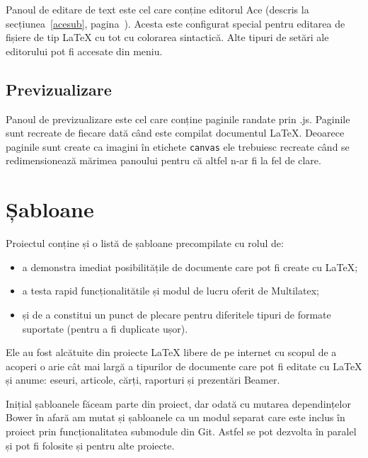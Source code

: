 \documentclass[a4wide,12pt]{report}
\newcommand{\cod}[1]{\texttt{#1}}
\newcommand{\acr}[1]{{\textsmaller[1]{\textsc{#1}}}} %
\begin{document}
Panoul de editare de text este cel care conține editorul Ace (descris la
secțiunea~\ref{acesub}, pagina~\pageref{acesub}). Acesta este configurat special
pentru editarea de fișiere de tip \LaTeX{} cu tot cu colorarea sintactică. Alte
tipuri de setări ale editorului pot fi accesate din meniu.

\subsection{Previzualizare}

Panoul de previzualizare este cel care conține paginile randate prin
\acr{PDF}.js. Paginile sunt recreate de fiecare dată când este compilat
documentul \LaTeX{}. Deoarece paginile sunt create ca imagini în etichete
\cod{canvas} ele trebuiesc recreate când se redimensionează mărimea panoului
pentru că altfel n-ar fi la fel de clare.

\section{Șabloane}
\label{sabloanesec}

Proiectul conține și o listă de șabloane precompilate cu rolul de:

\begin{itemize}

\item a demonstra imediat posibilitățile de documente care pot fi create cu
\LaTeX{};

\item a testa rapid funcționalitătile și modul de lucru oferit de Multilatex;

\item și de a constitui un punct de plecare pentru diferitele tipuri de formate
suportate (pentru a fi duplicate ușor).

\end{itemize}

Ele au fost alcătuite din proiecte \LaTeX{} libere de pe internet cu scopul de a
acoperi o arie cât mai largă a tipurilor de documente care pot fi editate cu
\LaTeX{} și anume: eseuri, articole, cărți, raporturi și prezentări Beamer.

Inițial șabloanele făceam parte din proiect, dar odată cu mutarea dependințelor
Bower în afară am mutat și șabloanele ca un modul separat care este inclus în
proiect prin funcționalitatea submodule din Git. Astfel se pot dezvolta în
paralel și pot fi folosite și pentru alte proiecte.
\end{document}
